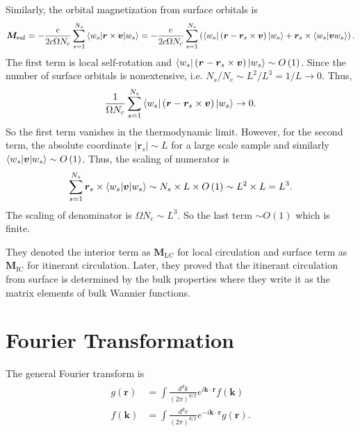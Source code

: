 \documentclass[12pt, oneside]{article}
\newcommand{\p}[1]{\left(#1\right)}
\numberwithin{equation}{subsection}
\begin{document}
Similarly, the orbital magnetization from surface orbitals is 
\begin{align}
	\bm{M}_{\mathrm{suf}} = -\frac{e}{2c\Omega N_c} \sum_{s = 1}^{N_s} \braket{w_s |\bm{r} \times \bm{v} | w_s} =-\frac{e}{2c\Omega N_c} \sum_{s = 1}^{N_s} \left(\braket{w_s | \left(\bm{r} - \bm{r}_{s} \times \bm{v} \right)| w_s} + \bm{r}_{s} \times \braket{w_s | \bm{v} w_s} \right) .
\end{align}
The first term is local self-rotation and \(\braket{w_s | \left(\bm{r} - \bm{r}_{s} \times \bm{v} \right)| w_s} \sim O \left(1\right)\). Since the number of surface orbitals is nonextensive, i.e. \(N_s/N_c \sim L^2/L^3 = 1/L \rightarrow 0\). Thus,
\begin{align}
	\frac{1}{\Omega N_c}  \sum_{s = 1}^{N_s} \braket{w_s | \left(\bm{r} - \bm{r}_{s} \times \bm{v} \right)| w_s} \rightarrow 0.
\end{align}
So the first term vanishes in the thermodynamic limit. However, for the second term, the absolute coordinate \(\left|\bm{r}_s\right| \sim L\) for a large scale sample and similarly \(\braket{w_s | \bm{v} |w_s} \sim O \left(1\right)\). Thus, the scaling of numerator is 
\begin{align}
	\sum_{s = 1}^{N_s} \bm{r}_{s} \times \braket{w_s | \bm{v} | w_s} \sim N_s \times L \times O \left(1\right) \sim L^2 \times L = L^3.
\end{align}
The scaling of denominator is \(\Omega N_c \sim L^3\). So the last term \(\sim O \left(1\right)\) which is finite.

They denoted the interior term as \(\bm{M}_{\mathrm{LC}}\) for local circulation and surface term as \(\bm{M}_{\mathrm{IC}}\) for itinerant circulation. Later, they proved that the itinerant circulation from surface is determined by the bulk properties where they write it as the matrix elements of bulk Wannier functions.



\appendix

\section{Fourier Transformation}
The general Fourier transform is 
\begin{align}
	\begin{split}
		g \p{\bm{r}} & = \int \frac{d^d k}{\p{2 \pi}^{d/2}} e^{i \bm{k} \cdot \bm{r}} f \p{\bm{k}} \\
		 f \p{\bm{k}} & = \int \frac{d^d r}{\p{2 \pi}^{d/2}} e^{ - i \bm{k} \cdot \bm{r}} g \p{\bm{r}}.
	\end{split}
\end{align}
\end{document}
